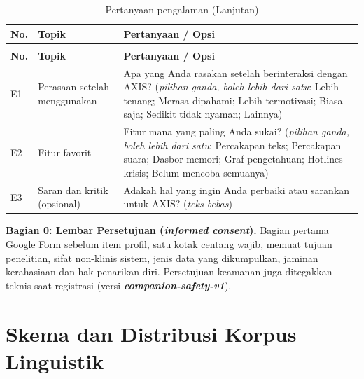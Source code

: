 \begingroup\footnotesize
\renewcommand{\arraystretch}{1.2}
\setlength{\tabcolsep}{2pt}
\begin{longtable}{|>{\centering\arraybackslash}p{1.0cm}|>{\raggedright\arraybackslash}p{4.5cm}|>{\raggedright\arraybackslash}p{8cm}|}
\caption{Pertanyaan pengalaman keseluruhan}\\
\hline
\rowcolor{tableheadgray}
\textbf{No.} & \textbf{Topik} & \textbf{Pertanyaan / Opsi}\\
\hline
\endfirsthead
\caption[]{Pertanyaan pengalaman (Lanjutan)}\\
\hline
\rowcolor{tableheadgray}
\textbf{No.} & \textbf{Topik} & \textbf{Pertanyaan / Opsi}\\
\hline
\endhead
\hline
\endlastfoot
E1 & Perasaan setelah menggunakan & Apa yang Anda rasakan setelah berinteraksi dengan AXIS? (\textit{pilihan ganda, boleh lebih dari satu}: Lebih tenang; Merasa dipahami; Lebih termotivasi; Biasa saja; Sedikit tidak nyaman; Lainnya)\\
\hline
E2 & Fitur favorit & Fitur mana yang paling Anda sukai? (\textit{pilihan ganda, boleh lebih dari satu}: Percakapan teks; Percakapan suara; Dasbor memori; Graf pengetahuan; Hotlines krisis; Belum mencoba semuanya)\\
\hline
E3 & Saran dan kritik (opsional) & Adakah hal yang ingin Anda perbaiki atau sarankan untuk AXIS? (\textit{teks bebas})\\
\end{longtable}
\endgroup

\textbf{Bagian 0: Lembar Persetujuan (\textit{informed consent}).} Bagian pertama Google Form sebelum item profil, satu kotak centang wajib, memuat tujuan penelitian, sifat non-klinis sistem, jenis data yang dikumpulkan, jaminan kerahasiaan dan hak penarikan diri. Persetujuan keamanan juga ditegakkan teknis saat registrasi (versi \textbf{\textit{companion-safety-v1}}).


\section{Skema dan Distribusi Korpus Linguistik}
\label{lamp:korpus}



